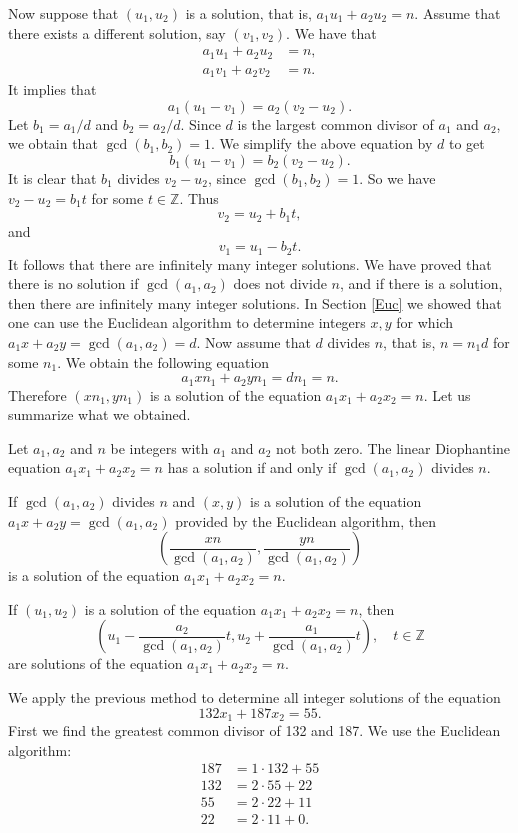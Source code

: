 Now suppose that $(u_1,u_2)$ is a solution, that is, $a_1u_1+a_2u_2=n$. Assume that there exists a
different solution, say $(v_1,v_2)$. We have that
\begin{align*}
a_1u_1+a_2u_2&=n,\\
a_1v_1+a_2v_2&=n.
\end{align*}
It implies that
$$
a_1(u_1-v_1)=a_2(v_2-u_2).
$$
Let $b_1=a_1/d$ and $b_2=a_2/d$. Since $d$ is the largest common divisor of $a_1$ and $a_2$, 
we obtain that $\gcd(b_1,b_2)=1$. We simplify the above equation by $d$ to get
$$
b_1(u_1-v_1)=b_2(v_2-u_2).
$$
It is clear that $b_1$ divides $v_2-u_2$, since $\gcd(b_1,b_2)=1$. So we have $v_2-u_2=b_1t$ 
for some $t\in\mathbb{Z}$. Thus 
$$
v_2=u_2+b_1t,
$$
and
$$
v_1=u_1-b_2t.
$$
It follows that there are infinitely many integer solutions. We have proved that there is no solution if 
$\gcd(a_1,a_2)$ does not divide $n$, and if there is a solution, then there are infinitely many integer solutions.
In Section \ref{Euc} we showed that one can use the Euclidean algorithm to determine integers $x,y$ for which
$a_1x+a_2y=\gcd(a_1,a_2)=d$. Now assume that $d$ divides $n$, that is, $n=n_1d$ for some $n_1$. We obtain the following 
equation
$$
a_1xn_1+a_2yn_1=dn_1=n.
$$
Therefore $(xn_1,yn_1)$ is a solution of the equation $a_1x_1+a_2x_2=n$. Let us summarize what we obtained.
\begin{theorem}\label{LinDioph}
 Let $a_1,a_2$ and $n$ be integers with $a_1$ and $a_2$ not both zero.
 The linear Diophantine equation $a_1x_1+a_2x_2=n$ has a solution if and only if $\gcd(a_1,a_2)$ divides $n$.
 
 If $\gcd(a_1,a_2)$ divides $n$ and $(x,y)$ is a solution of the equation $a_1x+a_2y=\gcd(a_1,a_2)$ provided
 by the Euclidean algorithm, then
 $$
 \left(\frac{xn}{\gcd(a_1,a_2)},\frac{yn}{\gcd(a_1,a_2)}\right)
 $$
 is a solution of the equation $a_1x_1+a_2x_2=n$.

 If $(u_1,u_2)$ is a solution of the equation $a_1x_1+a_2x_2=n$, then
$$
\left(u_1-\frac{a_2}{\gcd(a_1,a_2)}t, u_2+\frac{a_1}{\gcd(a_1,a_2)}t\right),\quad t\in\mathbb{Z}
$$
are solutions of the equation $a_1x_1+a_2x_2=n$.
\end{theorem}
We apply the previous method to determine all integer solutions of the equation
$$
132x_1+187x_2=55.
$$
First we find the greatest common divisor of 132 and 187. We use the Euclidean algorithm:
\begin{align*}
187 &= 1\cdot 132+55\\
 132 &= 2\cdot 55+22\\
 55 &= 2\cdot 22 + 11\\
 22 &= 2\cdot 11 + 0.
\end{align*}
